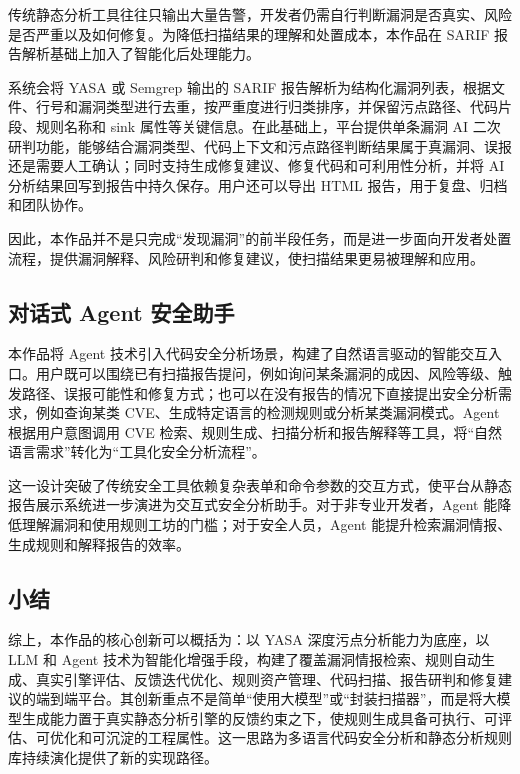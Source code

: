 \documentclass[a4paper,12pt,UTF8]{ctexart}
\numberwithin{figure}{section}
\numberwithin{table}{section}
\numberwithin{equation}{section}
\begin{document}
{\songti
传统静态分析工具往往只输出大量告警，开发者仍需自行判断漏洞是否真实、风险是否严重以及如何修复。为降低扫描结果的理解和处置成本，本作品在 SARIF 报告解析基础上加入了智能化后处理能力。

系统会将 YASA 或 Semgrep 输出的 SARIF 报告解析为结构化漏洞列表，根据文件、行号和漏洞类型进行去重，按严重度进行归类排序，并保留污点路径、代码片段、规则名称和 sink 属性等关键信息。在此基础上，平台提供单条漏洞 AI 二次研判功能，能够结合漏洞类型、代码上下文和污点路径判断结果属于真漏洞、误报还是需要人工确认；同时支持生成修复建议、修复代码和可利用性分析，并将 AI 分析结果回写到报告中持久保存。用户还可以导出 HTML 报告，用于复盘、归档和团队协作。

因此，本作品并不是只完成“发现漏洞”的前半段任务，而是进一步面向开发者处置流程，提供漏洞解释、风险研判和修复建议，使扫描结果更易被理解和应用。
\par}

\subsection{对话式 Agent 安全助手}

{\songti
本作品将 Agent 技术引入代码安全分析场景，构建了自然语言驱动的智能交互入口。用户既可以围绕已有扫描报告提问，例如询问某条漏洞的成因、风险等级、触发路径、误报可能性和修复方式；也可以在没有报告的情况下直接提出安全分析需求，例如查询某类 CVE、生成特定语言的检测规则或分析某类漏洞模式。Agent 根据用户意图调用 CVE 检索、规则生成、扫描分析和报告解释等工具，将“自然语言需求”转化为“工具化安全分析流程”。

这一设计突破了传统安全工具依赖复杂表单和命令参数的交互方式，使平台从静态报告展示系统进一步演进为交互式安全分析助手。对于非专业开发者，Agent 能降低理解漏洞和使用规则工坊的门槛；对于安全人员，Agent 能提升检索漏洞情报、生成规则和解释报告的效率。
\par}

\subsection{小结}

{\songti
综上，本作品的核心创新可以概括为：以 YASA 深度污点分析能力为底座，以 LLM 和 Agent 技术为智能化增强手段，构建了覆盖漏洞情报检索、规则自动生成、真实引擎评估、反馈迭代优化、规则资产管理、代码扫描、报告研判和修复建议的端到端平台。其创新重点不是简单“使用大模型”或“封装扫描器”，而是将大模型生成能力置于真实静态分析引擎的反馈约束之下，使规则生成具备可执行、可评估、可优化和可沉淀的工程属性。这一思路为多语言代码安全分析和静态分析规则库持续演化提供了新的实现路径。
\par}
\end{document}
